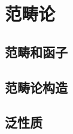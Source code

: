 \documentclass[../main.tex]{subfiles}
\begin{document}
\setcounter{chapter}{1}
\chapter{范畴论}\label{cha:linear_algebra}
\section{范畴和函子}
\section{范畴论构造}
\section{泛性质}
\end{document}
